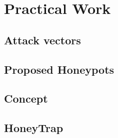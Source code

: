 \chapter{Practical Work}

\section{Attack vectors}

\section{Proposed Honeypots}

\section{Concept}

\section{HoneyTrap}